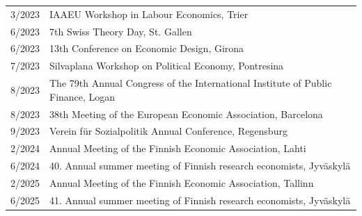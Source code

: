 \documentclass[16pt]{article}
\begin{document}
\begin{tabular}{@{}p{0.5in}p{6in}}
3/2023             & IAAEU Workshop in Labour Economics, Trier \\
6/2023             & 7th Swiss Theory Day, St. Gallen \\
6/2023             & 13th Conference on Economic Design, Girona \\
7/2023             & Silvaplana Workshop on Political Economy, Pontresina \\
8/2023             & The 79th Annual Congress of the International Institute of Public Finance, Logan \\
8/2023             & 38th Meeting of the European Economic Association, Barcelona \\
9/2023             & Verein für Sozialpolitik Annual Conference, Regensburg \\
2/2024             & Annual Meeting of the Finnish Economic Association, Lahti \\
6/2024             & 40. Annual summer meeting of Finnish research economists, Jyväskylä \\
2/2025             & Annual Meeting of the Finnish Economic Association, Tallinn \\
6/2025            & 41. Annual summer meeting of Finnish research economists, Jyväskylä \\
\end{tabular}
\end{document}
